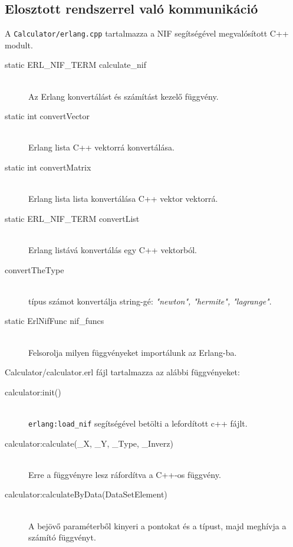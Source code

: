 \subsection{Elosztott rendszerrel való kommunikáció} 
	A \texttt{Calculator/erlang.cpp} tartalmazza a NIF segítségével megvalósított C++ modult.
	\begin{description}
		\item[static ERL\_NIF\_TERM calculate\_nif] \hfill \\
		Az Erlang konvertálást és számítást kezelő függvény. 
		\item[static int convertVector] \hfill \\
		Erlang lista C++ vektorrá konvertálása.
		\item[static int convertMatrix] \hfill \\
		Erlang lista lista konvertálása C++ vektor vektorrá.
		\item[static ERL\_NIF\_TERM convertList] \hfill \\
		Erlang listává konvertálás egy C++ vektorból.
		\item[convertTheType] \hfill \\
			típus számot konvertálja string-gé: 
			\textit{"newton", "hermite", "lagrange"}.
		\item[static ErlNifFunc nif\_funcs] \hfill \\
			Felsorolja milyen függvényeket importálunk az Erlang-ba.
	\end{description}
	Calculator/calculator.erl fájl tartalmazza az alábbi függvényeket: 
	\begin{description}
		\item[calculator:init()] \hfill \\
			\texttt{erlang:load\_nif} segítségével betölti a lefordított c++ fájlt.
		\item[calculator:calculate(\_X, \_Y, \_Type, \_Inverz)] \hfill \\
			Erre a függvényre lesz ráfordítva a C++-os függvény.
		\item[calculator:calculateByData(DataSetElement)] \hfill \\
		A bejövő paraméterből kinyeri a pontokat és a típust, majd meghívja a számító függvényt.
	\end{description}